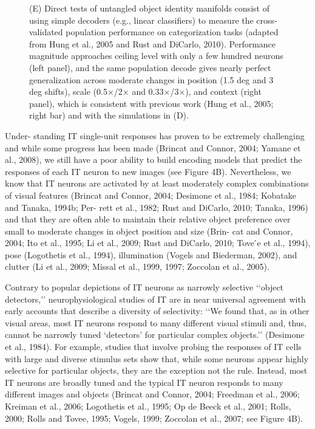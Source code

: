 \begin{figure}
{	(E) Direct tests of untangled object identity manifolds consist of using simple decoders (e.g., linear classifiers) to measure the cross-validated population performance on categorization tasks (adapted from Hung et al., 2005 and Rust and DiCarlo, 2010). Performance magnitude approaches ceiling level with only a few hundred neurons (left panel), and the same population decode gives nearly perfect generalization across moderate changes in position (1.5 deg and 3 deg shifts), scale (0.5×/2× and 0.33×/3×), and context (right panel), which is consistent with previous work (Hung et al., 2005; right bar) and with the simulations in (D).}
	\label{Fig:IT}
\end{figure}
Under-
standing IT single-unit responses has proven to be extremely
challenging and while some progress has been made (Brincat
and Connor, 2004; Yamane et al., 2008), we still have a poor
ability to build encoding models that predict the responses of
each IT neuron to new images (see Figure 4B). Nevertheless,
we know that IT neurons are activated by at least moderately
complex combinations of visual features (Brincat and Connor,
2004; Desimone et al., 1984; Kobatake and Tanaka, 1994b; Per-
rett et al., 1982; Rust and DiCarlo, 2010; Tanaka, 1996) and that
they are often able to maintain their relative object preference
over small to moderate changes in object position and size (Brin-
cat and Connor, 2004; Ito et al., 1995; Li et al., 2009; Rust and
DiCarlo, 2010; Tove ́e et al., 1994), pose (Logothetis et al.,
1994), illumination (Vogels and Biederman, 2002), and clutter
(Li et al., 2009; Missal et al., 1999, 1997; Zoccolan et al., 2005).

Contrary to popular depictions of IT neurons as narrowly
selective ‘‘object detectors,’’ neurophysiological studies of IT
are in near universal agreement with early accounts that describe
a diversity of selectivity: ‘‘We found that, as in other visual areas, most IT neurons respond to many different visual stimuli and,
thus, cannot be narrowly tuned ‘detectors’ for particular
complex objects.’’ (Desimone et al., 1984). For example,
studies that involve probing the responses of IT cells with large
and diverse stimulus sets show that, while some neurons appear
highly selective for particular objects, they are the exception not
the rule. Instead, most IT neurons are broadly tuned and the
typical IT neuron responds to many different images and objects
(Brincat and Connor, 2004; Freedman et al., 2006; Kreiman et al.,
2006; Logothetis et al., 1995; Op de Beeck et al., 2001; Rolls,
2000; Rolls and Tovee, 1995; Vogels, 1999; Zoccolan et al.,
2007; see Figure 4B).

